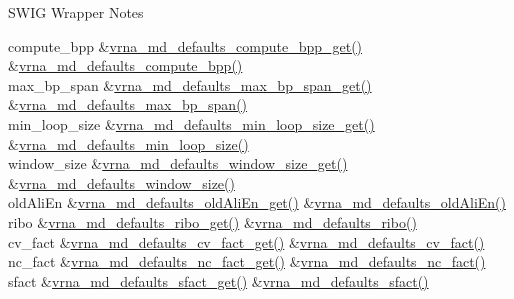 \begin{DoxyRefDesc}{S\+W\+I\+G Wrapper Notes}
\begin{longtabu}
compute\+\_\+bpp &\hyperlink{group__model__details_gaa3a537e61fbe0518673bf9f73fd820f3}{vrna\+\_\+md\+\_\+defaults\+\_\+compute\+\_\+bpp\+\_\+get()} &\hyperlink{group__model__details_gaf1b5db10f1f476767f9a95f8a78e3132}{vrna\+\_\+md\+\_\+defaults\+\_\+compute\+\_\+bpp()} \\
max\+\_\+bp\+\_\+span &\hyperlink{group__model__details_gaa60f989e062fecd4d4bac89c1883da85}{vrna\+\_\+md\+\_\+defaults\+\_\+max\+\_\+bp\+\_\+span\+\_\+get()} &\hyperlink{group__model__details_ga4c4bc962f09b4480cb8499f1cf8ae4ec}{vrna\+\_\+md\+\_\+defaults\+\_\+max\+\_\+bp\+\_\+span()} \\
min\+\_\+loop\+\_\+size &\hyperlink{group__model__details_ga5cc691174a75c652807dc361b617632a}{vrna\+\_\+md\+\_\+defaults\+\_\+min\+\_\+loop\+\_\+size\+\_\+get()} &\hyperlink{group__model__details_gac152f1e78c1058a10261022c8dfda0f7}{vrna\+\_\+md\+\_\+defaults\+\_\+min\+\_\+loop\+\_\+size()} \\
window\+\_\+size &\hyperlink{group__model__details_ga670146a9aa3ba77f4d422d60b7c30ac9}{vrna\+\_\+md\+\_\+defaults\+\_\+window\+\_\+size\+\_\+get()} &\hyperlink{group__model__details_ga7b802ce0e8c3181bf5cb580de6d5b26a}{vrna\+\_\+md\+\_\+defaults\+\_\+window\+\_\+size()} \\
old\+Ali\+En &\hyperlink{group__model__details_ga2374492b5019df88022fe4c05f0f3630}{vrna\+\_\+md\+\_\+defaults\+\_\+old\+Ali\+En\+\_\+get()} &\hyperlink{group__model__details_ga41521d5b9fb7e0f31e7ea73f5792afab}{vrna\+\_\+md\+\_\+defaults\+\_\+old\+Ali\+En()} \\
ribo &\hyperlink{group__model__details_ga169027f0c0561ea7d87b655e4b336bfc}{vrna\+\_\+md\+\_\+defaults\+\_\+ribo\+\_\+get()} &\hyperlink{group__model__details_ga937c45e1d06fd6168730a9b08d130be3}{vrna\+\_\+md\+\_\+defaults\+\_\+ribo()} \\
cv\+\_\+fact &\hyperlink{group__model__details_gae59c68393807217b0a2497adb64d3ee3}{vrna\+\_\+md\+\_\+defaults\+\_\+cv\+\_\+fact\+\_\+get()} &\hyperlink{group__model__details_gad3a3f40baafd91a6ce80a91a68e20053}{vrna\+\_\+md\+\_\+defaults\+\_\+cv\+\_\+fact()} \\
nc\+\_\+fact &\hyperlink{group__model__details_ga7ac759eaa7159bf5f022745f5da59508}{vrna\+\_\+md\+\_\+defaults\+\_\+nc\+\_\+fact\+\_\+get()} &\hyperlink{group__model__details_gac35e596c850dce3ad55c49119fd7d471}{vrna\+\_\+md\+\_\+defaults\+\_\+nc\+\_\+fact()} \\
sfact &\hyperlink{group__model__details_gab2df6aab954b63fd3592d18e90285dae}{vrna\+\_\+md\+\_\+defaults\+\_\+sfact\+\_\+get()} &\hyperlink{group__model__details_ga3f73d3029d3d0025d4cc311510cd95a3}{vrna\+\_\+md\+\_\+defaults\+\_\+sfact()} \\
\end{longtabu}
\end{DoxyRefDesc}
